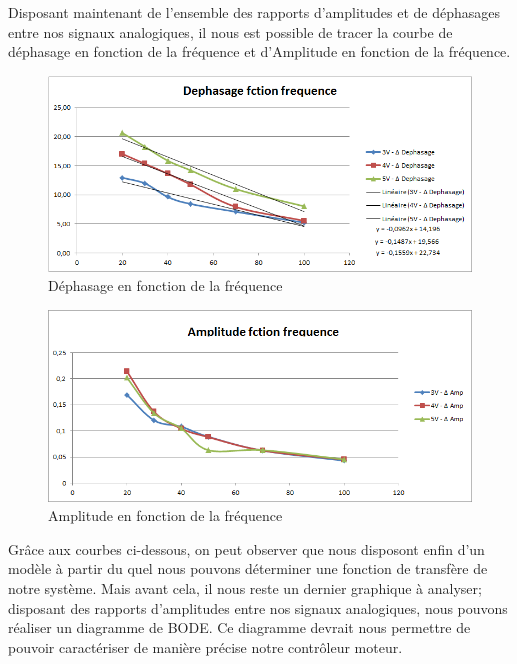 \documentclass[french,a4paper,12pt]{report}
\begin{document}
	Disposant maintenant de l'ensemble des rapports d'amplitudes et de déphasages entre nos signaux analogiques, il nous est possible de tracer la courbe de déphasage en fonction de la fréquence et d'Amplitude en fonction de la fréquence.
	 	
		\begin{figure}[!ht]
    \center
  	\includegraphics[width=15cm]{dFctionFreq.png}
    \caption{Déphasage en fonction de la fréquence}
	\end{figure}	
	
	\begin{figure}[!ht]
    \center
  	\includegraphics[width=15cm]{AFctionFreq.png}
    \caption{Amplitude en fonction de la fréquence}
	\end{figure}
	
	Grâce aux courbes ci-dessous, on peut observer que nous disposont enfin d'un modèle à partir du quel nous pouvons déterminer une fonction de transfère de notre système. Mais avant cela, il nous reste un dernier graphique à analyser; disposant des rapports d'amplitudes entre nos signaux analogiques, nous pouvons réaliser un diagramme de BODE. Ce diagramme devrait nous permettre de pouvoir caractériser de manière précise notre contrôleur moteur.
	
\end{document}
